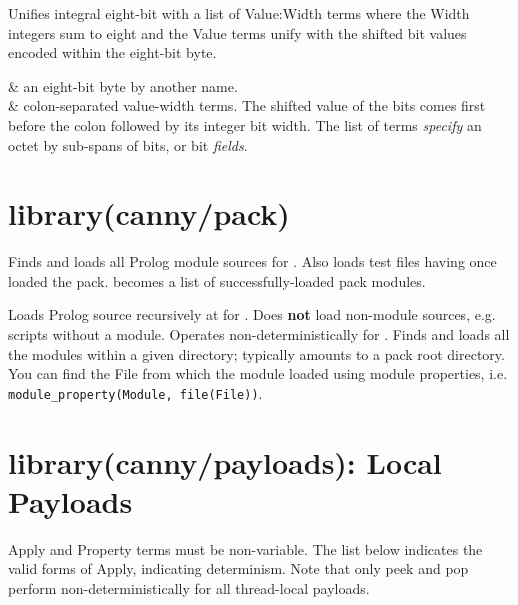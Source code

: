 \begin{description}
Unifies integral eight-bit  with a list of Value:Width terms
where the Width integers sum to eight and the Value terms unify with
the shifted bit values encoded within the eight-bit byte.

\begin{arguments}
 & an eight-bit byte by another name. \\
 & colon-separated value-width terms. The shifted value of
the bits comes first before the colon followed by its integer bit
width. The list of terms \textit{specify} an octet by sub-spans of bits, or
bit \textit{fields}. \\
\end{arguments}
\end{description}

\chapter{library(canny/pack)}\label{sec:pack}

\begin{description}
Finds and loads all Prolog module sources for . Also loads test
files having once loaded the pack.  becomes a list of
successfully-loaded pack modules.

Loads Prolog source recursively at  for . Does \textbf{not}
load non-module sources, e.g. scripts without a module. Operates
non-deterministically for . Finds and loads all the modules
within a given directory; typically amounts to a pack root
directory. You can find the File from which the module loaded using
module properties, i.e. \verb$module_property(Module, file(File))$.
\end{description}

\chapter{library(canny/payloads): Local Payloads}\label{sec:payloads}

Apply and Property terms must be non-variable. The list below
indicates the valid forms of Apply, indicating determinism. Note that
only peek and pop perform non-deterministically for all thread-local
payloads.

